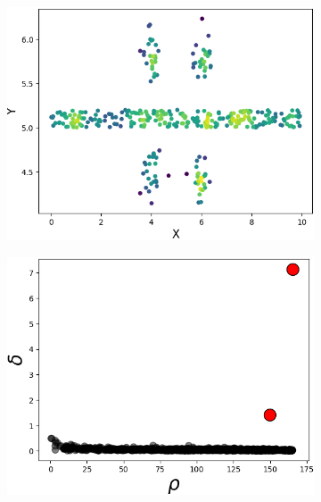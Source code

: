 \documentclass{llncs}
\begin{document}
\begin{figure}[ht]
\begin{subfigure}[t]{0.25\textwidth}
\includegraphics[width=1\textwidth]{image/dgf_org_0.png}
\end{subfigure}
\begin{subfigure}[t]{0.25\textwidth}
\centering
\includegraphics[width=1\textwidth]{image/dgf_dg_1.png}
\end{subfigure}
\begin{subfigure}[t]{0.25\textwidth}
\centering

\end{subfigure}
\end{figure}
\end{document}
